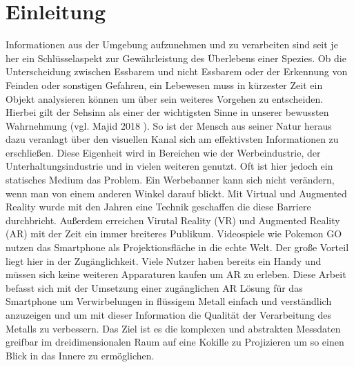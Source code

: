 \section{Einleitung}
Informationen aus der Umgebung aufzunehmen und zu verarbeiten sind seit je her ein Schlüsselaspekt zur Gewährleistung des Überlebens einer Spezies. Ob die Unterscheidung zwischen Essbarem und nicht Essbarem oder der Erkennung von Feinden oder sonstigen Gefahren, ein Lebewesen muss in kürzester Zeit ein Objekt analysieren können um über sein weiteres Vorgehen zu entscheiden. \newline
Hierbei gilt der Sehsinn als einer der wichtigsten Sinne in unserer bewussten Wahrnehmung (vgl. Majid 2018 \cite{Majid11369}). So ist der Mensch aus seiner Natur heraus dazu veranlagt über den visuellen Kanal sich am effektivsten Informationen zu erschließen. Diese Eigenheit wird in Bereichen wie der Werbeindustrie, der Unterhaltungsindustrie und in vielen weiteren genutzt. Oft ist hier jedoch ein statisches Medium das Problem. Ein Werbebanner kann sich nicht verändern, wenn man von einem anderen Winkel darauf blickt. Mit Virtual und Augmented Reality wurde mit den Jahren eine Technik geschaffen die diese Barriere durchbricht. Außerdem erreichen Virutal Reality (VR) und Augmented Reality (AR) mit der Zeit ein immer breiteres Publikum. Videospiele wie Pokemon GO nutzen das Smartphone als Projektionsfläche in die echte Welt. Der große Vorteil liegt hier in der Zugänglichkeit. Viele Nutzer haben bereits ein Handy und müssen sich keine weiteren Apparaturen kaufen um AR zu erleben.\newline
Diese Arbeit befasst sich mit der Umsetzung einer zugänglichen AR Lösung für das Smartphone um Verwirbelungen in flüssigem Metall einfach und verständlich anzuzeigen und um mit dieser Information
die Qualität der Verarbeitung des Metalls zu verbessern. Das Ziel ist es die komplexen und abstrakten Messdaten greifbar im dreidimensionalen Raum auf eine Kokille zu Projizieren um so einen Blick in das Innere zu ermöglichen.